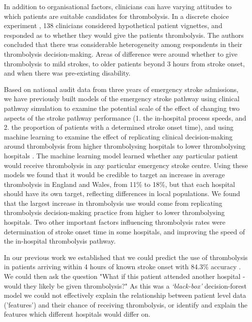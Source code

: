 In addition to organisational factors, clinicians can have varying attitudes to which patients are suitable candidates for thrombolysis. In a discrete choice experiment \cite{de_brun_factors_2018}, 138 clinicians considered hypothetical patient vignettes, and responded as to whether they would give the patients thrombolysis. The authors concluded that there was considerable heterogeneity among respondents in their thrombolysis decision-making. Areas of difference were around whether to give thrombolysis to mild strokes, to older patients beyond 3 hours from stroke onset, and when there was pre-existing disability.

Based on national audit data from three years of emergency stroke admissions, we have previously built models of the emergency stroke pathway using clinical pathway simulation to examine the potential scale of the effect of changing two aspects of the stroke pathway performance (1. the in-hospital process speeds, and 2. the proportion of patients with a determined stroke onset time), and using machine learning to examine the effect of replicating clinical decision-making around thrombolysis from higher thrombolysing hospitals to lower thrombolysing hospitals \cite{allen_using_2022, allen_use_2022}. The machine learning model learned whether any particular patient would receive thrombolysis in any particular emergency stroke centre. Using these models we found that it would be credible to target an increase in average thrombolysis in England and Wales, from 11\% to 18\%, but that each hospital should have its own target, reflecting differences in local populations. We found that the largest increase in thrombolysis use would come from replicating thrombolysis decision-making practice from higher to lower thrombolysing hospitals. Two other important factors influencing thrombolysis rates were determination of stroke onset time in some hospitals, and improving the speed of the in-hospital thrombolysis pathway.


In our previous work we established that we could predict the use of thrombolysis in patients arriving within 4 hours of known stroke onset with 84.3\% accuracy \cite{allen_use_2022}. We could then ask the question "What if this patient attended another hospital - would they likely be given thrombolysis?" As this was a \emph{`black-box'} decision-forest model we could not effectively explain the relationship between patient level data ('features') and their chance of receiving thrombolysis, or identify and explain the features which different hospitals would differ on.

